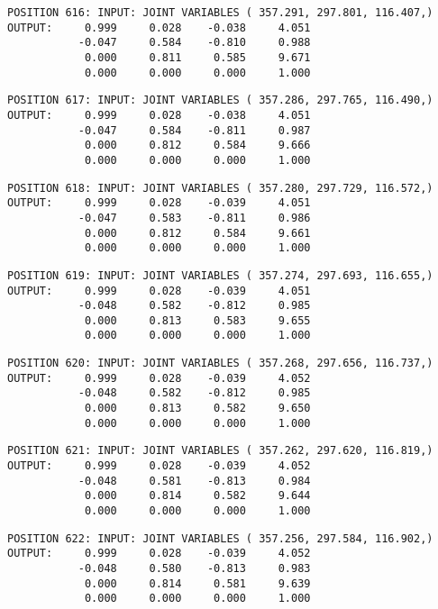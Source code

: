 \begin{verbatim}
POSITION 616: INPUT: JOINT VARIABLES ( 357.291, 297.801, 116.407,)
OUTPUT:     0.999     0.028    -0.038     4.051
           -0.047     0.584    -0.810     0.988
            0.000     0.811     0.585     9.671
            0.000     0.000     0.000     1.000
\end{verbatim} \pagebreak[1]\begin{verbatim}
POSITION 617: INPUT: JOINT VARIABLES ( 357.286, 297.765, 116.490,)
OUTPUT:     0.999     0.028    -0.038     4.051
           -0.047     0.584    -0.811     0.987
            0.000     0.812     0.584     9.666
            0.000     0.000     0.000     1.000
\end{verbatim} \pagebreak[1]\begin{verbatim}
POSITION 618: INPUT: JOINT VARIABLES ( 357.280, 297.729, 116.572,)
OUTPUT:     0.999     0.028    -0.039     4.051
           -0.047     0.583    -0.811     0.986
            0.000     0.812     0.584     9.661
            0.000     0.000     0.000     1.000
\end{verbatim} \pagebreak[1]\begin{verbatim}
POSITION 619: INPUT: JOINT VARIABLES ( 357.274, 297.693, 116.655,)
OUTPUT:     0.999     0.028    -0.039     4.051
           -0.048     0.582    -0.812     0.985
            0.000     0.813     0.583     9.655
            0.000     0.000     0.000     1.000
\end{verbatim} \pagebreak[1]\begin{verbatim}
POSITION 620: INPUT: JOINT VARIABLES ( 357.268, 297.656, 116.737,)
OUTPUT:     0.999     0.028    -0.039     4.052
           -0.048     0.582    -0.812     0.985
            0.000     0.813     0.582     9.650
            0.000     0.000     0.000     1.000
\end{verbatim} \pagebreak[1]\begin{verbatim}
POSITION 621: INPUT: JOINT VARIABLES ( 357.262, 297.620, 116.819,)
OUTPUT:     0.999     0.028    -0.039     4.052
           -0.048     0.581    -0.813     0.984
            0.000     0.814     0.582     9.644
            0.000     0.000     0.000     1.000
\end{verbatim} \pagebreak[1]\begin{verbatim}
POSITION 622: INPUT: JOINT VARIABLES ( 357.256, 297.584, 116.902,)
OUTPUT:     0.999     0.028    -0.039     4.052
           -0.048     0.580    -0.813     0.983
            0.000     0.814     0.581     9.639
            0.000     0.000     0.000     1.000
\end{verbatim} \pagebreak[1]\begin{verbatim}

\end{verbatim}
